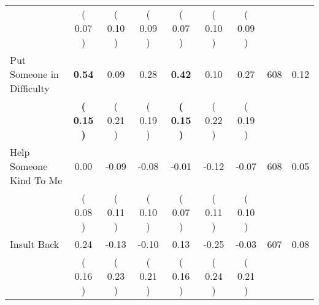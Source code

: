 \begin{tabular}{lcccccccc}
 & (     0.07 ) & (     0.10 ) & (     0.09 ) & (     0.07 ) & (     0.10 ) & (     0.09 ) & \\
Put Someone in Difficulty & \textbf{     0.54} &      0.09 &      0.28 & \textbf{     0.42} &      0.10 &      0.27 & 608 &       0.12 \\ 
 & \textbf{(     0.15 )} & (     0.21 ) & (     0.19 ) & \textbf{(     0.15 )} & (     0.22 ) & (     0.19 ) & \\
Help Someone Kind To Me &      0.00 &     -0.09 &     -0.08 &     -0.01 &     -0.12 &     -0.07 & 608 &       0.05 \\ 
 & (     0.08 ) & (     0.11 ) & (     0.10 ) & (     0.07 ) & (     0.11 ) & (     0.10 ) & \\
Insult Back &      0.24 &     -0.13 &     -0.10 &      0.13 &     -0.25 &     -0.03 & 607 &       0.08 \\ 
 & (     0.16 ) & (     0.23 ) & (     0.21 ) & (     0.16 ) & (     0.24 ) & (     0.21 ) & \\
\bottomrule
\end{tabular}
